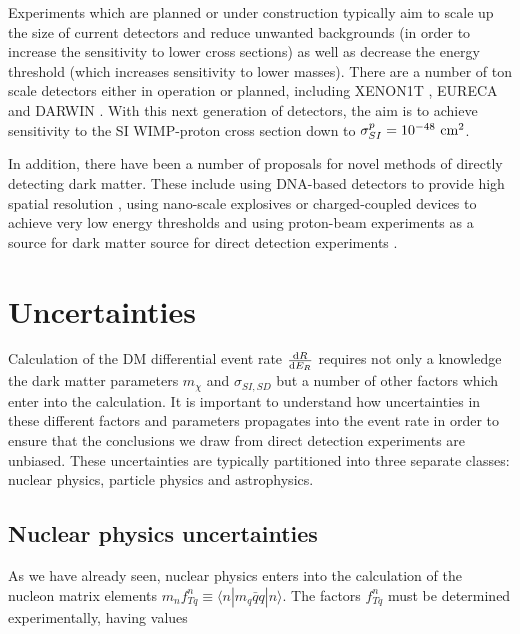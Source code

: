 Experiments which are planned or under construction typically aim to scale up the size of current detectors and reduce unwanted backgrounds (in order to increase the sensitivity to lower cross sections) as well as decrease the energy threshold (which increases sensitivity to lower masses). There are a number of ton scale detectors either in operation or planned, including XENON1T \cite{Aprile:2012a}, EURECA \cite{Kraus:2007,Roth:2009} and DARWIN \cite{Baudis:2012}. With this next generation of detectors, the aim is to achieve sensitivity to the SI WIMP-proton cross section down to $\sigma_{SI}^p = 10^{-48} \textrm{ cm}^2$.

In addition, there have been a number of proposals for novel methods of directly detecting dark matter. These include using DNA-based detectors to provide high spatial resolution \cite{Drukier:2012}, using nano-scale explosives \cite{Lopez:2014} or charged-coupled devices \cite{Aguilar-Arevalo:2013} to achieve very low energy thresholds and using proton-beam experiments as a source for dark matter source for direct detection experiments \cite{deNiverville:2012}.



\section{Uncertainties}

Calculation of the DM differential event rate $\frac{\mathrm{d}R}{\mathrm{d}E_R}$ requires not only a knowledge the dark matter parameters $m_\chi$ and $\sigma_{SI,SD}$ but a number of other factors which enter into the calculation. It is important to understand how uncertainties in these different factors and parameters propagates into the event rate in order to ensure that the conclusions we draw from direct detection experiments are unbiased. These uncertainties are typically partitioned into three separate classes: nuclear physics, particle physics and astrophysics.

\subsection{Nuclear physics uncertainties}

As we have already seen, nuclear physics enters into the calculation of the nucleon matrix elements $m_n f_{Tq}^n \equiv \langle n|m_q\bar{q}q|n \rangle$. The factors $f_{Tq}^n$ must be determined experimentally, having values

